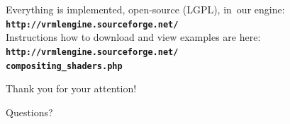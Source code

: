 \documentclass{beamer}
\begin{document}
\begin{frame}[t]

\begin{center}
{\small
Everything is implemented, open-source (LGPL), in~our engine:\\
{\color{blue} \textbf{\texttt{http://vrmlengine.sourceforge.net/}}}\\
Instructions how to download and view examples are here:\\
{\color{blue} \textbf{\texttt{http://vrmlengine.sourceforge.net/\\
compositing\_shaders.php}}}}
\end{center}

\vspace{0.25in}

\begin{center}
{\Large Thank you for your attention!}
\end{center}


\begin{center}
{\Huge \alert{Questions?}}
\end{center}

\end{frame}
\end{document}
